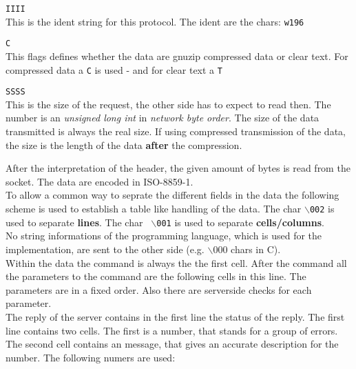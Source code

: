\documentclass[a4paper,10pt]{article}
\begin{document}
\begin{description}

\item {\tt IIII}\\
This is the ident string for this protocol. The ident are the chars: {\tt w196} \\

\item {\tt C}\\
This flags defines whether the data are gnuzip compressed data or clear text.
For compressed data a {\tt C} is used - and for clear text a {\tt T}

\item {\tt SSSS}\\
This is the size of the request, the other side has to expect to read then.
The number is an {\it unsigned long int} in {\it network byte order}.  The
size of the data transmitted is always the real size. If using compressed
transmission of the data, the size is the length of the data {\bf after} the
compression.\\

\end{description}

After the interpretation of the header, the given amount of bytes is read from
the socket. The data are encoded in ISO-8859-1.\\

To allow a common way to seprate the different fields in the data the
following scheme is used to establish a table like handling of the data. The
char {\tt $\backslash$002} is used to separate {\bf lines}. The char {\tt
$\backslash$001} is used to separate {\bf cells/columns}.\\

No string informations of the programming language, which is used for the
implementation, are sent to the other side (e.g. $\backslash$000 chars in
C).\\

Within the data the command is always the the first cell. After the command
all the parameters to the command are the following cells in this line. The
parameters are in a fixed order. Also there are serverside checks for each
parameter.\\

The reply of the server contains in the first line the status of the reply.
The first line contains two cells. The first is a number, that stands for a
group of errors. The second cell contains an message, that gives an accurate
description for the number. The following numers are used:\\
\end{document}
